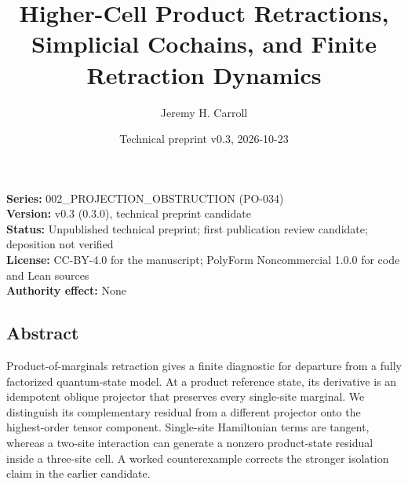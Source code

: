 \documentclass[
  11pt,
]{article}
\title{Higher-Cell Product Retractions, Simplicial Cochains, and Finite Retraction Dynamics}
\author{Jeremy H. Carroll}
\date{Technical preprint v0.3, 2026-10-23}
\begin{document}
\maketitle

\textbf{Series:} 002\_PROJECTION\_OBSTRUCTION (PO-034)\\
\textbf{Version:} v0.3 (0.3.0), technical preprint candidate\\
\textbf{Status:} Unpublished technical preprint; first publication review candidate; deposition not verified\\
\textbf{License:} CC-BY-4.0 for the manuscript; PolyForm Noncommercial 1.0.0 for code and Lean sources\\
\textbf{Authority effect:} None

\subsection{Abstract}\label{abstract}

Product-of-marginals retraction gives a finite diagnostic for departure from a fully factorized quantum-state model. At a product reference state, its derivative is an idempotent oblique projector that preserves every single-site marginal. We distinguish its complementary residual from a different projector onto the highest-order tensor component. Single-site Hamiltonian terms are tangent, whereas a two-site interaction can generate a nonzero product-state residual inside a three-site cell. A worked counterexample corrects the stronger isolation claim in the earlier candidate.
\end{document}

